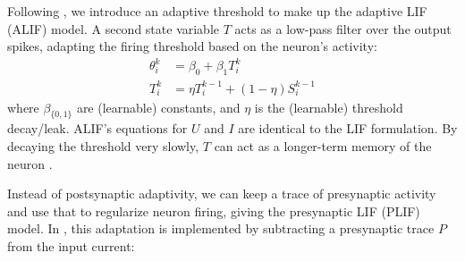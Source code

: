 Following \cite{bellec2018long}, we introduce an adaptive threshold to make up the adaptive LIF (ALIF) model. A second state variable $T$ acts as a low-pass filter over the output spikes, adapting the firing threshold based on the neuron's activity:
\begin{align}
	\label{eq:neurips_alif}
	\theta_i^{k} &= \beta_0 + \beta_1 T_i^{k} \\
	T_i^{k} &= \eta T_i^{k-1} + (1 - \eta) S_i^{k-1}
\end{align}
where $\beta_{\{0,1\}}$ are (learnable) constants, and %
$\eta$ 
is the (learnable) threshold decay/leak. ALIF's equations for $U$ and $I$ are identical to the LIF formulation. %
By decaying the threshold very slowly, $T$ can act as a longer-term memory of the neuron \cite{bellec2020solution}.

Instead of postsynaptic adaptivity, we can keep a trace of presynaptic activity and use that to regularize neuron firing, giving the presynaptic LIF (PLIF) model. In \cite{paredes-valles2020unsupervised}, this adaptation is implemented by subtracting a presynaptic trace $P$ from the input current:


